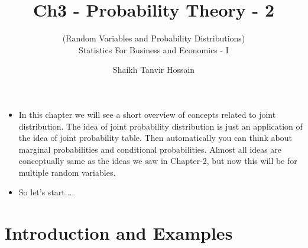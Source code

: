 \documentclass[8pt, usepdftitle = false]{beamer}
\title{\LARGE Ch3 - Probability Theory - 2}
\subtitle{{\fontsize{10}{10}\selectfont\color{gray!50!balck} 
(Random Variables and Probability Distributions)} \\
\vspace*{.2cm} Statistics For Business and Economics - I}
\author{Shaikh Tanvir Hossain\vspace*{-.4cm}}
\institute{ East West University, Dhaka\\ Last Updated \today}
\date{\vspace{-5pt}}
\begin{document}



\begin{frame}[allowframebreaks]{}

\begin{itemize}
\item In this chapter we will see a short overview of concepts related to joint distribution. The idea of joint probability distribution is just an application of the idea of joint probability table. Then automatically you can think about marginal probabilities and conditional probabilities. Almost all ideas are conceptually same as the ideas we saw in Chapter-2, but now this will be for multiple random variables.





\item So let's start...\faWalking \faWalking \faWalking.

\end{itemize}

\end{frame}



\section{Introduction and Examples}
\frame{\sectionpage}
\end{document}
